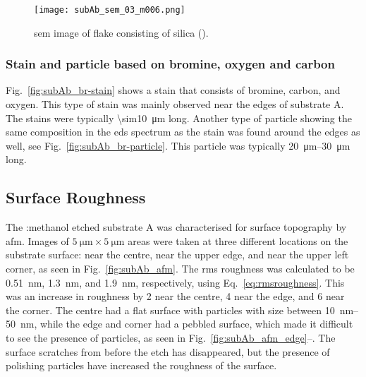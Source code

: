 \begin{figure}
    \centering
    \texttt{[image: subAb\_sem\_03\_m006.png]}
    \caption[\Ac{sem} image of silica flake.]{\Ac{sem} image of flake consisting of silica ().}\label{fig:subAb_silica2_magnified}
\end{figure}

\subsubsection{Stain and particle based on bromine, oxygen and carbon}

Fig.~\ref{fig:subAb_br-stain} shows a stain that consists of bromine, carbon, and oxygen. This type of stain was mainly observed  near the edges of substrate A. The stains were typically \SI{\sim10}{\micro\metre} long. Another type of particle showing the same composition in the \ac{eds} spectrum as the stain was found around the edges as well, see Fig.~\ref{fig:subAb_br-particle}. This particle was typically \SIrange{20}{30}{\micro\metre} long.

\subsection{Surface Roughness}

The :methanol etched substrate A was characterised for surface topography by \ac{afm}. Images of $\SI{5}{\micro\metre}\times\SI{5}{\micro\metre}$ areas were taken at three different locations on the substrate surface: near the centre, near the upper edge, and near the upper left corner, as seen in Fig.~\ref{fig:subAb_afm}. The \ac{rms} roughness was calculated to be \SI{0.51}{\nano\metre}, \SI{1.3}{\nano\metre}, and \SI{1.9}{\nano\metre}, respectively, using Eq.~\ref{eq:rmsroughness}. This was an increase in roughness by 2 near the centre, 4 near the edge, and 6 near the corner. The centre had a flat surface with particles with size between \SIrange{10}{50}{\nano\metre}, while the edge and corner had a pebbled surface, which made it difficult to see the presence of particles, as seen in Fig.~\ref{fig:subAb_afm_edge}--. The surface scratches from before the etch has disappeared, but the presence of polishing particles have increased the roughness of the surface.

